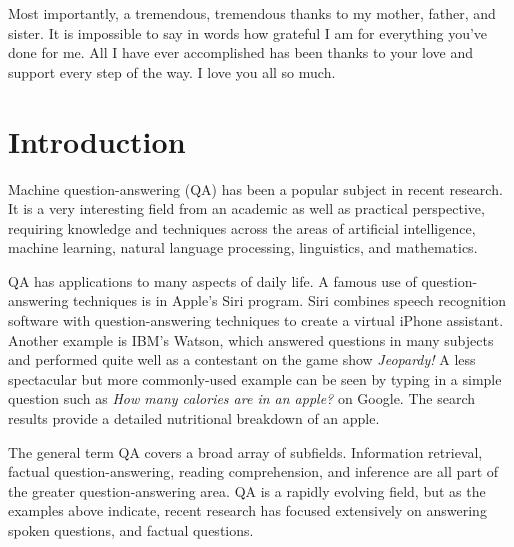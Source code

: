\documentclass[pageno]{final_paper}
\begin{document}
Most importantly, a tremendous, tremendous thanks to my mother, father, and
sister. It is impossible to say in words how grateful I am for everything you've
done for me. All I have ever accomplished has been thanks to your love and
support every step of the way. I love you all so much.

\newpage

\restoregeometry
{\large \tableofcontents}
\newpage
%
%

\thispagestyle{empty}
\doublespacing

\section{Introduction}
\label{Introduction}

Machine question-answering (QA) has been a popular subject in recent research.
It is a very interesting field from an academic as well as practical
perspective, requiring knowledge and techniques across the areas of artificial
intelligence, machine learning, natural language processing, linguistics, and
mathematics.

QA has applications to many aspects of daily life. A famous use of
question-answering techniques is in Apple's Siri program. Siri combines speech
recognition software with question-answering techniques to create a virtual
iPhone assistant. Another example is IBM's Watson, which answered questions in
many subjects and performed quite well as a contestant on the game show
\textit{Jeopardy!} A less spectacular but more commonly-used example can be seen
by typing in a simple question such as \textit{How many calories are in an
apple?} on Google. The search results provide a detailed nutritional breakdown
of an apple.

The general term QA covers a broad array of subfields. Information retrieval,
factual question-answering, reading comprehension, and inference are all part
of the greater question-answering area. QA is a rapidly evolving field, but as
the examples above indicate, recent research has focused extensively on
answering spoken questions, and factual questions.
\end{document}
